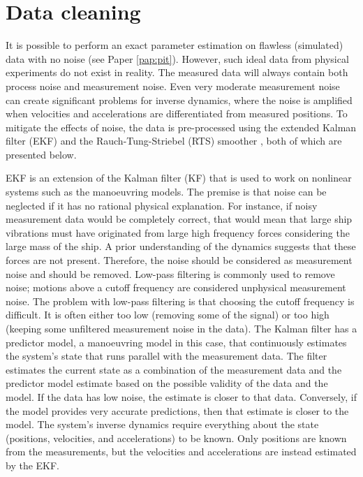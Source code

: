 \section{Data cleaning}
\label{sec:datacleaning}
It is possible to perform an exact parameter estimation on flawless (simulated) data with no noise (see Paper \ref{pap:pit}). However, such ideal data from physical experiments do not exist in reality. The measured data will always contain both process noise and measurement noise. Even very moderate measurement noise can create significant problems for inverse dynamics, where the noise is amplified when velocities and accelerations are differentiated from measured positions.
To mitigate the effects of noise, the data is pre-processed using the extended Kalman filter (EKF) \cite{brownIntroductionRandomSignals1997} and the Rauch-Tung-Striebel (RTS) smoother \cite{rauchMaximumLikelihoodEstimates1965}, both of which are presented below.

EKF is an extension of the Kalman filter (KF) that is used to work on nonlinear systems such as the manoeuvring models. The premise is that noise can be neglected if it has no rational physical explanation. For instance, if noisy measurement data would be  completely correct, that would mean that large ship vibrations must have originated from large high frequency forces considering the large mass of the ship. A prior understanding of the dynamics suggests that these forces are not present. Therefore, the noise should be considered as measurement noise and should be removed. Low-pass filtering is commonly used to remove noise; motions above a cutoff frequency are considered unphysical measurement noise. The problem with low-pass filtering is that choosing the cutoff frequency is difficult. It is often  either too low (removing some of the signal) or too high (keeping some unfiltered measurement noise in the data). The Kalman filter has a predictor model, a manoeuvring model in this case, that continuously estimates the system’s state that runs parallel with the measurement data. The filter estimates the current state as a combination of the measurement data and the predictor model estimate based on the possible validity of the data and the model. If the data has low noise, the estimate is closer to that data. Conversely, if the model provides very accurate predictions, then that estimate is closer to the model.
The system’s inverse dynamics require everything about the state (positions, velocities, and accelerations) to be known. Only positions are known from the measurements, but the velocities and accelerations are instead estimated by the EKF.

